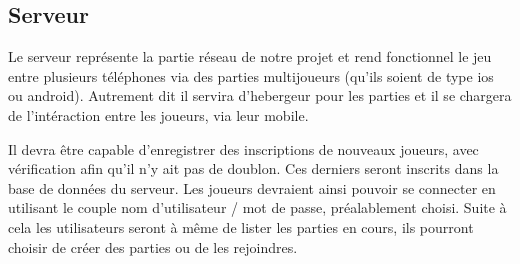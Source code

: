 \subsection{Serveur}
	
	Le serveur représente la partie réseau de notre projet et rend fonctionnel le jeu entre plusieurs téléphones via des parties multijoueurs (qu'ils soient de type
	\gls{ios} ou \gls{android}). Autrement dit il servira d'hebergeur pour les parties et
	il se chargera de l'intéraction entre les joueurs, via leur mobile.
	
	Il devra être capable d'enregistrer des inscriptions de nouveaux joueurs, avec
	vérification afin qu'il n'y ait pas de doublon. Ces derniers seront inscrits dans 
	la base de données du serveur. Les joueurs devraient ainsi
	pouvoir se connecter en utilisant le couple nom d'utilisateur / mot de passe,
	préalablement choisi. Suite à cela les utilisateurs seront à même de lister
	les parties en cours, ils pourront choisir de créer des parties ou de les rejoindres.
